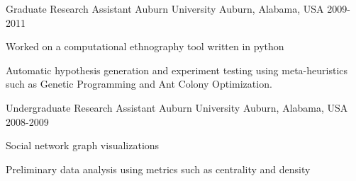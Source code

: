 \begin{cventries}
  \cventry
    {Graduate Research Assistant} %
    {Auburn University} %
    {Auburn, Alabama, USA} %
    {2009-2011} %
    {
      \begin{cvitems} %
\item Worked on a computational ethnography tool written in python
\item Automatic hypothesis generation and experiment testing using meta-heuristics such as Genetic Programming and Ant Colony Optimization.
      \end{cvitems}
    }

  \cventry
    {Undergraduate Research Assistant} %
    {Auburn University} %
    {Auburn, Alabama, USA} %
    {2008-2009} %
    {
      \begin{cvitems} %
\item Social network graph visualizations
\item Preliminary data analysis using metrics such as centrality and density
      \end{cvitems}
    }

\end{cventries}

